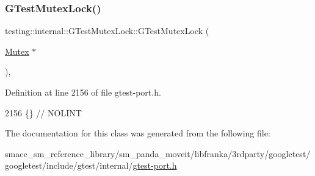 \subsubsection{\texorpdfstring{G\+Test\+Mutex\+Lock()}{GTestMutexLock()}}
{\footnotesize\ttfamily testing\+::internal\+::\+G\+Test\+Mutex\+Lock\+::\+G\+Test\+Mutex\+Lock (\begin{DoxyParamCaption}\item[{\hyperlink{classtesting_1_1internal_1_1Mutex}{Mutex} $\ast$}]{ }\end{DoxyParamCaption})\hspace{0.3cm}{\ttfamily [inline]}, {\ttfamily [explicit]}}



Definition at line 2156 of file gtest-\/port.\+h.


\begin{DoxyCode}
2156 \{\}  \textcolor{comment}{// NOLINT}
\end{DoxyCode}


The documentation for this class was generated from the following file\+:\begin{DoxyCompactItemize}
\item 
smacc\+\_\+sm\+\_\+reference\+\_\+library/sm\+\_\+panda\+\_\+moveit/libfranka/3rdparty/googletest/googletest/include/gtest/internal/\hyperlink{gtest-port_8h}{gtest-\/port.\+h}\end{DoxyCompactItemize}
